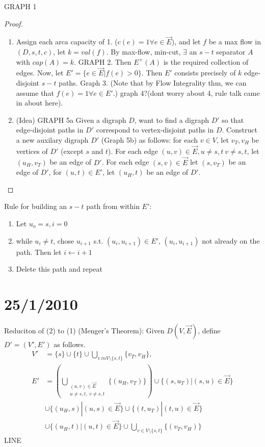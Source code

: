 \documentclass{article}
\begin{document}
GRAPH 1

\begin{proof}
\begin{enumerate}
 \item Assign each arca  capacity of 1. ($c(e)=1 \forall e \in \overrightarrow{E}$), and let $f$ be a max flow in $(D,s,t,c)$,  let $k=val(f)$.  By max-flow, min-cut, $\exists$ an $s-t$ separator $A$ with $cap(A)=k$.  GRAPH 2.  Then $E^+(A)$ is the required collection of edges.  Now, let $E'=\{e \in \overrightarrow{E} | f(e)>0 \}$.  Then $E'$ consists precisely of $k$ edge-disjoint $s-t$ paths. Graph 3. (Note that by Flow Integrality thm, we can assume that $f(e)=1 \forall e \in E'$.) graph 4?(dont worry about 4, rule talk came in about here).
\item (Idea) GRAPH 5a Given a digraph $D$, want to find a digraph $D'$ so that edge-disjoint paths in $D'$ correspond to vertex-disjoint paths in $D$.  Construct a new auxilary digraph $D'$ (Graph 5b) as follows: for each $v \in V$, let $v_T, v_H$ be vertices of $D'$ (except $s$ and $t$).  For each edge $(u,v) \in \overrightarrow{E}, u \neq s,t ~ v \neq s,t$, let $(u_H,v_T)$ be an edge of $D'$.  For each edge $(s,v) \in \overrightarrow{E}$ let $(s,v_T)$ be an edge of $D'$, for $(u,t) \in E'$, let $(u_H,t)$ be an edge of $D'$.
\end{enumerate}
\end{proof}

Rule for building an $s-t$ path from within $E'$: \begin{enumerate}
 \item Let $u_o = s, i =0$
\item while $u_i \neq t$, chose $u_{i+1}$ s.t. $(u_i, u_{i+1}) \in E'$, $(u_i, u_{i+1})$ not already on the path.  Then let $i\leftarrow i+1$
\item Delete this path and repeat
\end{enumerate}

\section*{25/1/2010}

Reduciton of (2) to (1) (Menger's Theorem): Given $D(V,\overrightarrow{E})$, define $D'=(V',E')$ as follows.  
\begin{align*}V' &= \{s\} \cup \{t\} \cup \displaystyle \bigcup_{v \ in V\setminus \{s,t\}} \{v_T, v_H\}, \\ 
E' &= ( \displaystyle\bigcup_{\substack{(u,v) \in \overrightarrow{E} \\ u \neq s,t,~v \neq s,t}} \{(u_H,v_T)\}
) \cup \{(s,u_T) | (s,u) \in \overrightarrow{E}\}  \\
&\cup \{(u_H,s) | (u,s) \in \overrightarrow{E}\} \cup \{(t,u_T) | (t,u) \in \overrightarrow{E}\}\\
&\cup \{(u_H,t) | (u,t) \in \overrightarrow{E}\} \cup \bigcup_{v \in V \setminus \{s,t\}} \{(v_T,v_H)\}
\end{align*}
LINE
\end{document}
